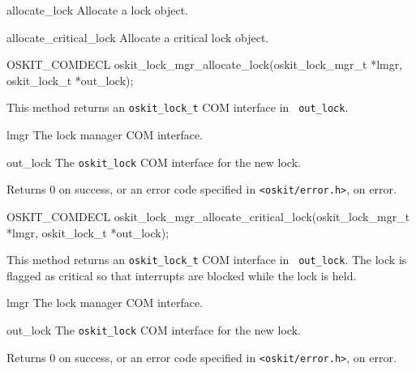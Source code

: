 \begin{csymlist}
\item[allocate_lock]
	Allocate a lock object.
\item[allocate_critical_lock]
	Allocate a critical lock object.
\end{csymlist}

\begin{apisyn}

	\funcproto OSKIT_COMDECL
	oskit_lock_mgr_allocate_lock(oskit_lock_mgr_t *lmgr,
				    \outparam oskit_lock_t *out_lock);
\end{apisyn}
\begin{apidesc}
	This method returns an {\tt oskit_lock_t} COM interface in {\tt
	out_lock}.
\end{apidesc}
\begin{apiparm}
	\item[lmgr]
		The lock manager COM interface.
	\item[out_lock]
		The {\tt oskit_lock} COM interface for the new lock.
\end{apiparm}
\begin{apiret}
	Returns 0 on success, or an error code specified in
	{\tt <oskit/error.h>}, on error.
\end{apiret}


\begin{apisyn}

	\funcproto OSKIT_COMDECL
	oskit_lock_mgr_allocate_critical_lock(oskit_lock_mgr_t *lmgr,
				    \outparam oskit_lock_t *out_lock);
\end{apisyn}
\begin{apidesc}
	This method returns an {\tt oskit_lock_t} COM interface in {\tt
	out_lock}. The lock is flagged as critical so that interrupts are
	blocked while the lock is held.
\end{apidesc}
\begin{apiparm}
	\item[lmgr]
		The lock manager COM interface.
	\item[out_lock]
		The {\tt oskit_lock} COM interface for the new lock.
\end{apiparm}
\begin{apiret}
	Returns 0 on success, or an error code specified in
	{\tt <oskit/error.h>}, on error.
\end{apiret}

